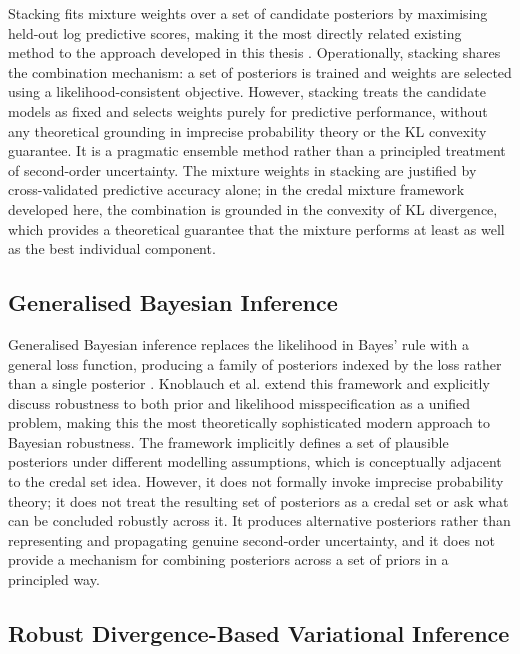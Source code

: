 Stacking fits mixture weights over a set of candidate posteriors by 
maximising held-out log predictive scores, making it the most directly 
related existing method to the approach developed in this thesis \citep{yao2018}. Operationally, stacking shares the combination mechanism: 
a set of posteriors is trained and weights are selected using a 
likelihood-consistent objective. However, stacking treats the candidate 
models as fixed and selects weights purely for predictive performance, 
without any theoretical grounding in imprecise probability theory or the 
KL convexity guarantee. It is a pragmatic ensemble method rather than 
a principled treatment of second-order uncertainty. The mixture weights 
in stacking are justified by cross-validated predictive accuracy alone; 
in the credal mixture framework developed here, the combination is 
grounded in the convexity of KL divergence, which provides a theoretical 
guarantee that the mixture performs at least as well as the best 
individual component.

\subsection{Generalised Bayesian Inference}

Generalised Bayesian inference replaces the likelihood in Bayes' rule 
with a general loss function, producing a family of posteriors indexed 
by the loss rather than a single posterior \citep{bissiri2016}. 
Knoblauch et al. \citep{knoblauch2022} extend this framework and explicitly discuss 
robustness to both prior and likelihood misspecification as a unified 
problem, making this the most theoretically sophisticated modern approach 
to Bayesian robustness. The framework implicitly defines a set of 
plausible posteriors under different modelling assumptions, which is 
conceptually adjacent to the credal set idea. However, it does not 
formally invoke imprecise probability theory; it does not treat the 
resulting set of posteriors as a credal set or ask what can be concluded 
robustly across it. It produces alternative posteriors rather than 
representing and propagating genuine second-order uncertainty, and it 
does not provide a mechanism for combining posteriors across a set 
of priors in a principled way.

\subsection{Robust Divergence-Based Variational Inference}

